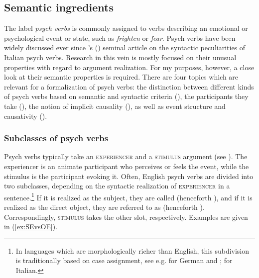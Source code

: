 \subsection{Semantic ingredients} 
\label{sec:psy-input-prev}

The label \textit{psych verbs} is commonly assigned to verbs describing an emotional or psychological event or state, such as \textit{frighten} or \textit{fear}. Psych verbs have been widely discussed ever since \citeauthor{Belletti.1988}'s (\citeyear{Belletti.1988}) seminal article on the syntactic peculiarities of Italian psych verbs. Research in this vein is mostly focused on their unusual properties with regard to argument realization. For my purposes, however, a close look at their semantic properties is required. There are four topics which are relevant for a formalization of psych verbs: the distinction between different kinds of psych verbs based on semantic and syntactic criteria (), the participants they take (), the notion of implicit causality (), as well as event structure and causativity ().

\subsubsection{Subclasses of psych verbs}
\label{sec:psy-input-prev-SEvsOE}

Psych verbs typically take an \textsc{experiencer} and a \textsc{stimulus} argument (see \citealt[189]{Levin.1993}). The experiencer is an animate participant who perceives or feels the event, while the stimulus is the participant evoking it. Often, English psych verbs are divided into two subclasses, depending on the syntactic realization of \textsc{experiencer} in a sentence.\footnote{In languages which are morphologically richer than English, this subdivision is traditionally based on case assignment, see e.g. \citet{Klein.2005} for German and \citet{Belletti.1988}; \citet{Varchetta.2010} for Italian.} If it is realized as the subject, they are called  (henceforth ), and if it is realized as the direct object, they are referred to as  (henceforth ). Correspondingly, \textsc{stimulus} takes the other slot, respectively. Examples are given in (\ref{ex:SEvsOE}).

